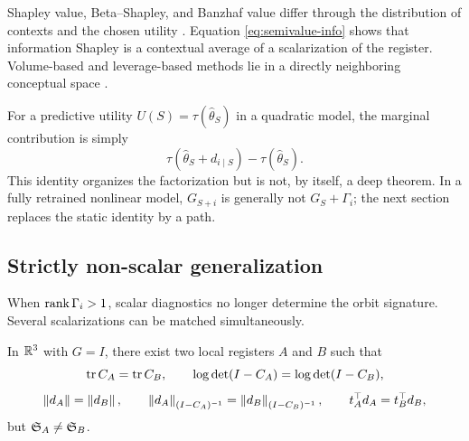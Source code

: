 Shapley value, Beta--Shapley, and Banzhaf value differ through the distribution of contexts and the chosen utility \citep{ghorbani2019,kwon2022,wang2023banzhaf}. Equation \eqref{eq:semivalue-info} shows that information Shapley is a contextual average of a scalarization of the register. Volume-based and leverage-based methods lie in a directly neighboring conceptual space \citep{xu2021volume,mendozasmith2025}.

For a predictive utility $U(S)=\tau(\widehat\theta_S)$ in a quadratic model, the marginal contribution is simply
\[
\tau(\widehat\theta_S+d_{i\mid S})-\tau(\widehat\theta_S).
\]
This identity organizes the factorization but is not, by itself, a deep theorem. In a fully retrained nonlinear model, $G_{S+i}$ is generally not $G_S+\Gamma_i$; the next section replaces the static identity by a path.

\subsection{Strictly non-scalar generalization}
When $\operatorname{rank}\Gamma_i>1$, scalar diagnostics no longer determine the orbit signature. Several scalarizations can be matched simultaneously.

\begin{proposition}
In $\mathbb{R}^3$ with $G=I$, there exist two local registers $A$ and $B$ such that
\begin{equation}
\operatorname{tr} C_A=\operatorname{tr} C_B,
\qquad
\log\det(I-C_A)=\log\det(I-C_B),
\end{equation}
\begin{equation}
\left\lVert d_A\right\rVert=\left\lVert d_B\right\rVert,
\qquad
\left\lVert d_A\right\rVert_{(I-C_A)^{-1}}=\left\lVert d_B\right\rVert_{(I-C_B)^{-1}},
\qquad
t_A^\top d_A=t_B^\top d_B,
\end{equation}
but $\mathfrak S_A\neq\mathfrak S_B$.
\end{proposition}

